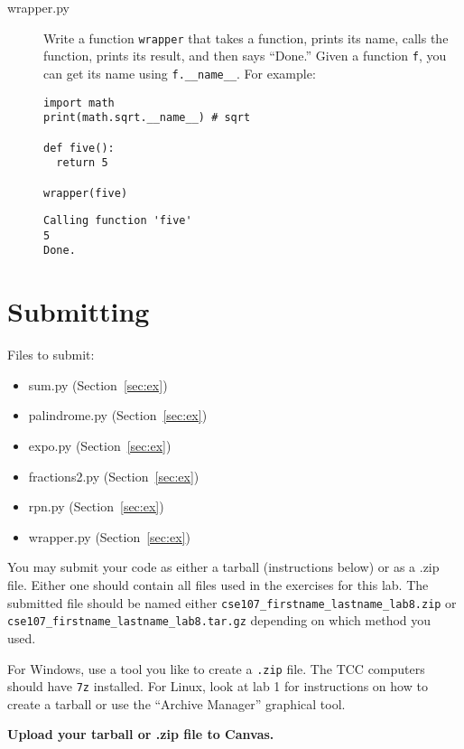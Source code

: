 \documentclass[11pt]{cselabheader}
\begin{document}
\begin{description}
  \item[wrapper.py] Write a function \lstinline!wrapper! that takes a function,
    prints its name, calls the function, prints its result, and then says
    ``Done.'' Given a function \lstinline!f!, you can get its name using
    \lstinline!f.__name__!. For
    example:

    \begin{lstlisting}
import math
print(math.sqrt.__name__) # sqrt

def five():
  return 5

wrapper(five)
    \end{lstlisting}
    \begin{lstlisting}[style=bash]
Calling function 'five'
5
Done.
    \end{lstlisting}
\end{description}

\pagebreak
\section{Submitting}

Files to submit:
\begin{itemize}
  \item sum.py (Section~\ref{sec:ex}) 
  \item palindrome.py (Section~\ref{sec:ex})
  \item expo.py (Section~\ref{sec:ex})
  \item fractions2.py (Section~\ref{sec:ex})
  \item rpn.py (Section~\ref{sec:ex})
  \item wrapper.py (Section~\ref{sec:ex})
\end{itemize}

You may submit your code as either a tarball (instructions below) or as a .zip
file. Either one should contain all files used in the exercises for this lab.
The submitted file should be named either
\texttt{cse107\_firstname\_lastname\_lab8.zip} or
\texttt{cse107\_firstname\_lastname\_lab8.tar.gz} depending on which method you
used.

For Windows, use a tool you like to create a \texttt{.zip} file. The TCC
computers should have \texttt{7z} installed. For Linux, look at lab 1 for
instructions on how to create a tarball or use the ``Archive Manager'' graphical
tool.

\begin{center}
  \textbf{Upload your tarball or .zip file to Canvas.}
\end{center}
\end{document}
